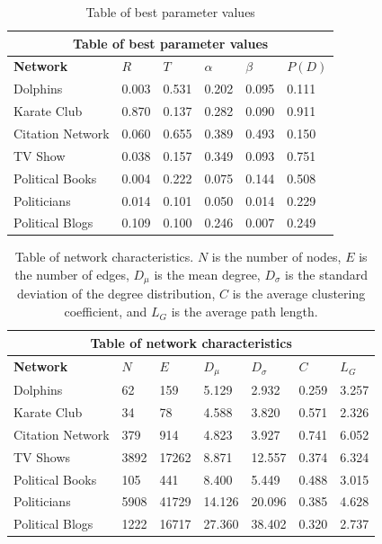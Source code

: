 \documentclass{article}
\begin{document}
\begin{table}[H]
\begin{center}
    
\begin{tabular}{ |p{3cm}||p{2cm}|p{2cm}|p{2cm}|p{2cm}|p{2cm}|}
    \hline
    \multicolumn{6}{|c|}{Table of best parameter values} \\
    \hline
    \bf{Network} & $R$ & $T$ & $\alpha$ & $\beta$ & $P(D)$\\
    \hline
    Dolphins   & 0.003    &0.531&   0.202&   0.095&   0.111\\
    Karate Club&   0.870  & 0.137   &0.282&   0.090&   0.911\\
    Citation Network   &0.060 & 0.655&  0.389&   0.493&   0.150\\
    TV Show & 0.038 & 0.157 & 0.349 & 0.093 & 0.751 \\
    Political Books &0.004 & 0.222&  0.075&   0.144&   0.508\\
    Politicians&   0.014  & 0.101 &0.050&   0.014&   0.229\\
    Political Blogs & 0.109  & 0.100   &0.246&   0.007&   0.249\\
    \hline
\end{tabular}
\end{center}
\caption{Table of best parameter values}
\label{table:best_params}
\end{table}

\begin{table}[H]
    \begin{center}
        
    \begin{tabular}{ |p{3cm}||p{1.5cm}|p{1.5cm}|p{1.5cm}|p{1.5cm}|p{1.5cm}|p{1.5cm}|}
        \hline
        \multicolumn{7}{|c|}{Table of network characteristics} \\
        \hline
        \bf{Network} & $N$ & $E$ & $D_{\mu}$ & $D_{\sigma}$ & $C$ & $L_G$\\
        \hline
        Dolphins   & 62    &159&   5.129&   2.932 &   0.259 & 3.257\\
        Karate Club &34	&78	&4.588&	3.820&	0.571&	2.326\\
        Citation Network & 379 &	914	& 4.823	& 3.927 & 0.741 & 6.052 \\
        TV Shows & 3892 & 17262&8.871 & 12.557 & 0.374&6.324\\
        Political Books &105 &	441	& 8.400 &	5.449 &	0.488 &	3.015\\
        Politicians&  5908 &41729 & 14.126 & 20.096 &	0.385 & 4.628\\
        Political Blogs &	1222 & 16717 & 27.360 & 38.402 & 0.320 & 2.737\\
        \hline
    \end{tabular}
    \end{center}
    \caption{Table of network characteristics. $N$ is the number of nodes, $E$ is the number of edges, $D_{\mu}$ is the mean degree, $D_{\sigma}$ is the standard deviation of the degree distribution, $C$ is the average clustering coefficient, and $L_G$ is the average path length. }
    \label{table:characteristics}
    \end{table}
\end{document}
